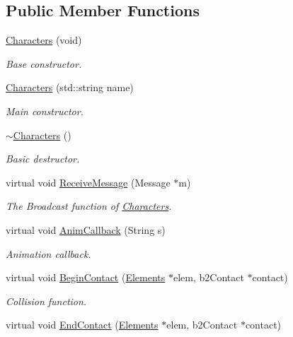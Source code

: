 \subsection*{Public Member Functions}
\begin{DoxyCompactItemize}
\item 
\hyperlink{class_characters_a3b7d631de563c07caaa918e217a97436}{Characters} (void)
\begin{DoxyCompactList}\small\item\em Base constructor. \end{DoxyCompactList}\item 
\hyperlink{class_characters_a3ebbe5ca8cc3965b55283af002ce8707}{Characters} (std\-::string name)
\begin{DoxyCompactList}\small\item\em Main constructor. \end{DoxyCompactList}\item 
\hyperlink{class_characters_a4aea85daea3f08b8b933e82cd42b3109}{$\sim$\-Characters} ()
\begin{DoxyCompactList}\small\item\em Basic destructor. \end{DoxyCompactList}\item 
virtual void \hyperlink{class_characters_ae6b55c4269efc485d7926f62544eef4e}{Receive\-Message} (Message $\ast$m)
\begin{DoxyCompactList}\small\item\em The Broadcast function of \hyperlink{class_characters}{Characters}. \end{DoxyCompactList}\item 
virtual void \hyperlink{class_characters_a6354b7fd409cde57312c5eca1cf43275}{Anim\-Callback} (String s)
\begin{DoxyCompactList}\small\item\em Animation callback. \end{DoxyCompactList}\item 
virtual void \hyperlink{class_characters_ae1b52f35e60cd23ec118595a9a8e8760}{Begin\-Contact} (\hyperlink{class_elements}{Elements} $\ast$elem, b2\-Contact $\ast$contact)
\begin{DoxyCompactList}\small\item\em Collision function. \end{DoxyCompactList}\item 
virtual void \hyperlink{class_characters_a87c76bb34f5c11e2da4537be07d2f846}{End\-Contact} (\hyperlink{class_elements}{Elements} $\ast$elem, b2\-Contact $\ast$contact)

\end{DoxyCompactItemize}
